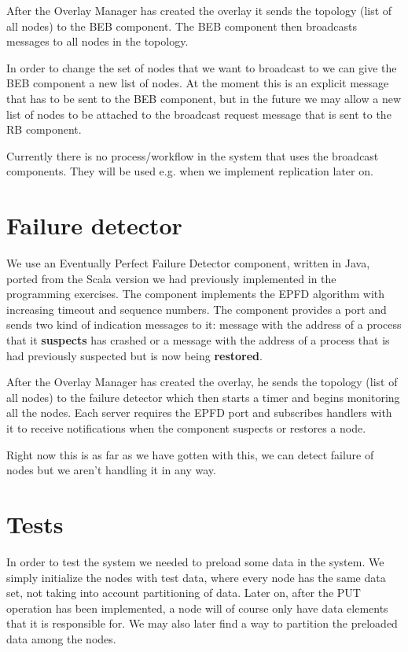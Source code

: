 \documentclass[a4paper, 11pt]{article}
\begin{document}
After the Overlay Manager has created the overlay it sends the topology (list of all nodes) to the BEB component. The BEB component then broadcasts messages to all nodes in the topology.

In order to change the set of nodes that we want to broadcast to we can give the BEB component a new list of nodes. At the moment this is an explicit message that has to be sent to the BEB component, but in the future we may allow a new list of nodes to be attached to the broadcast request message that is sent to the RB component.

Currently there is no process/workflow in the system that uses the broadcast components. They will be used e.g. when we implement replication later on.

\section{Failure detector}

We use an Eventually Perfect Failure Detector component, written in Java, ported from the Scala version we had previously implemented in the programming exercises. The component implements the EPFD algorithm with increasing timeout and sequence numbers. The component provides a port and sends two kind of indication messages to it: message with the address of a process that it \textbf{suspects} has crashed or a message with the address of a process that is had previously suspected but is now being \textbf{restored}.

After the Overlay Manager has created the overlay, he sends the topology (list of all nodes) to the failure detector which then starts a timer and begins monitoring all the nodes. Each server requires the EPFD port and subscribes handlers with it to receive notifications when the component suspects or restores a node. 

Right now this is as far as we have gotten with this, we can detect failure of nodes but we aren't handling it in any way.

\section{Tests}

In order to test the system we needed to preload some data in the system. We simply initialize the nodes with test data, where every node has the same data set, not taking into account partitioning of data. Later on, after the PUT operation has been implemented, a node will of course only have data elements that it is responsible for. We may also later find a way to partition the preloaded data among the nodes.
\end{document}
